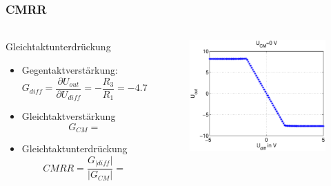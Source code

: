 \begin{frame}
\frametitle{CMRR}
\framesubtitle{}
    \begin{columns}[c]
    \begin{block}{Gleichtaktunterdrückung}
         \begin{itemize}
             \item Gegentaktverstärkung:
             \begin{equation*}
                 G_{diff} = \frac{\partial U_{out}}{\partial U_{diff} } = -
                 \frac{R_3}{R_1}= -4.7
             \end{equation*}
             \item Gleichtaktverstärkung
             \begin{equation*}
                 G_{CM} =
             \end{equation*}
             \item Gleichtaktunterdrückung
             \begin{equation*}
                 CMRR= \frac{G_{|diff}|}{|G_{CM}|}=
             \end{equation*}
         \end{itemize}
    \end{block}
    \begin{figure}[H]
    \begin{center}
            \includegraphics[scale=0.3]{./img/plots/Auf_3_Ucm_0.eps}
    \end{center}
    \end{figure}

\end{columns}
\end{frame}
